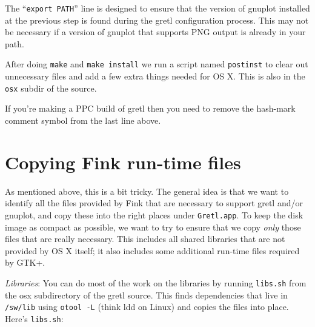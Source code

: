 \documentclass{article}
\begin{document}
The ``\texttt{export PATH}'' line is designed to ensure that the
version of gnuplot installed at the previous step is found during the
gretl configuration process.  This may not be necessary if a version
of gnuplot that supports PNG output is already in your path.

After doing \texttt{make} and \texttt{make install} we run a script
named \texttt{postinst} to clear out unnecessary files and add a few
extra things needed for OS X.  This is also in the \texttt{osx} subdir
of the source.


If you're making a PPC build of gretl then you need to remove the
hash-mark comment symbol from the last line above.


\section{Copying Fink run-time files}

As mentioned above, this is a bit tricky.  The general idea is that we
want to identify all the files provided by Fink that are necessary to
support gretl and/or gnuplot, and copy these into the right places
under \texttt{Gretl.app}.  To keep the disk image as compact as
possible, we want to try to ensure that we copy \textit{only} those
files that are really necessary.  This includes all shared libraries
that are not provided by OS X itself; it also includes some additional
run-time files required by GTK+.

\textit{Libraries}: You can do most of the work on the libraries by
running \texttt{libs.sh} from the osx subdirectory of the gretl
source.  This finds dependencies that live in \texttt{/sw/lib} using
\texttt{otool -L} (think ldd on Linux) and copies the files
into place. Here's \texttt{libs.sh}:
\end{document}
